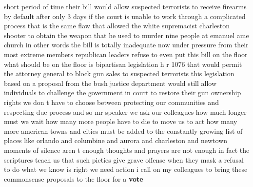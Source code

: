 \documentclass{article}
\begin{document}
short period of time their bill would allow suspected terrorists to receive firearms by default after only 3 days if the court is unable to work through a complicated process that is the same flaw that allowed the white supremacist charleston shooter to obtain the weapon that he used to murder nine people at emanuel ame church in other words the bill is totally inadequate now under pressure from their most extreme members republican leaders refuse to even put this bill on the floor what should be on the floor is bipartisan legislation h r 1076 that would permit the attorney general to block gun sales to suspected terrorists this legislation based on a proposal from the bush justice department would still allow individuals to challenge the government in court to restore their gun ownership rights we don t have to choose between protecting our communities and respecting due process and so mr speaker we ask our colleagues how much longer must we wait how many more people have to die to move us to act how many more american towns and cities must be added to the constantly growing list of places like orlando and columbine and aurora and charleston and newtown moments of silence aren t enough thoughts and prayers are not enough in fact the scriptures teach us that such pieties give grave offense when they mask a refusal to do what we know is right we need action i call on my colleagues to bring these commonsense proposals to the floor for a {\bf \color{red} vote}\pagebreak
\end{document}
